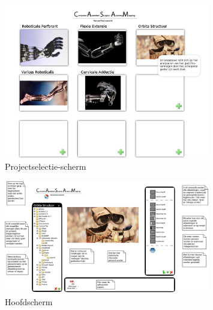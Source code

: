 \begin{figure}[htp]
\begin{center}
	\includegraphics[width=0.8\textwidth]{projectoverzicht}
\caption{Projectselectie-scherm}
\label{default}
\end{center}
\end{figure}

\begin{figure}[htp]
\begin{center}
	\includegraphics[width=0.8\textwidth]{main_uitleg}
\caption{Hoofdscherm}
\label{default}
\end{center}
\end{figure}


